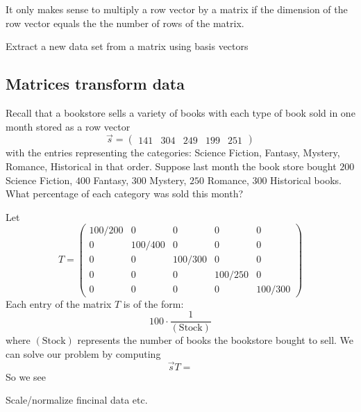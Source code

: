 \documentclass{ximera}
\begin{document}
\begin{warning}
  It only makes sense to multiply a row vector by a matrix if the
  dimension of the row vector equals the the number of rows of the
  matrix.
\end{warning}

\begin{example}
Extract a new data set from a matrix using basis vectors
\end{example}


\begin{example}
\end{example}



\subsection{Matrices transform data}


\begin{example}
  Recall that a bookstore sells a variety of books with each type of
  book sold in one month stored as a row vector
  \[
  \vec{s} = \begin{pmatrix}141 & 304 & 249 & 199 & 251 \end{pmatrix}
  \]
  with the entries representing the categories: Science Fiction,
  Fantasy, Mystery, Romance, Historical in that order.  Suppose last
  month the book store bought $200$ Science Fiction, $400$ Fantasy, $300$
  Mystery, $250$ Romance, $300$ Historical books. What percentage of each
  category was sold this month?
  \begin{solution}
    Let
    \[
    T =
    \begin{pmatrix}
      100/200 & 0 &    0   &   0    &   0 \\
      0 & 100/400 &    0   &   0    &   0 \\
      0 &   0   &  100/300 &   0    &   0 \\
      0 &   0   &    0   & 100/250  &   0 \\
      0 &   0   &    0   &   0    & 100/300
    \end{pmatrix}
    \]
    Each entry of the matrix $T$ is of the form:
    \[
    100 \cdot \frac{1}{(\text{Stock})}
    \]
    where $(\text{Stock})$ represents the number of books the
    bookstore bought to sell.  We can solve our problem by computing
    \[
    \vec{s} T =
    \]
    So we see
  \end{solution}

\end{example}




\begin{example}[Navigation]
  Scale/normalize fincinal data etc.
\end{example}
\end{document}
